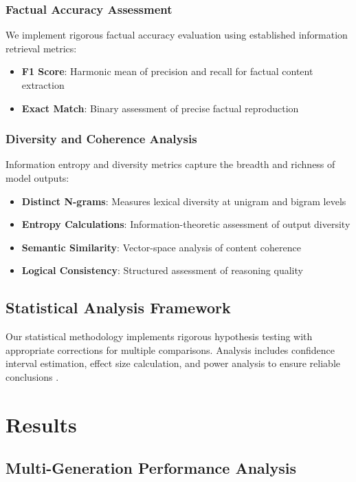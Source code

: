 \documentclass{article}
\begin{document}
\subsubsection{Factual Accuracy Assessment}

We implement rigorous factual accuracy evaluation using established information retrieval metrics:
\begin{itemize}
\item \textbf{F1 Score}: Harmonic mean of precision and recall for factual content extraction
\item \textbf{Exact Match}: Binary assessment of precise factual reproduction
\end{itemize}

\subsubsection{Diversity and Coherence Analysis}

Information entropy and diversity metrics capture the breadth and richness of model outputs:
\begin{itemize}
\item \textbf{Distinct N-grams}: Measures lexical diversity at unigram and bigram levels
\item \textbf{Entropy Calculations}: Information-theoretic assessment of output diversity \citep{shannon1948mathematical}
\item \textbf{Semantic Similarity}: Vector-space analysis of content coherence
\item \textbf{Logical Consistency}: Structured assessment of reasoning quality
\end{itemize}

\subsection{Statistical Analysis Framework}

Our statistical methodology implements rigorous hypothesis testing with appropriate corrections for multiple comparisons. Analysis includes confidence interval estimation, effect size calculation, and power analysis to ensure reliable conclusions \citep{hastie2009elements,wasserman2006all}.

\section{Results}

\subsection{Multi-Generation Performance Analysis}
\end{document}
